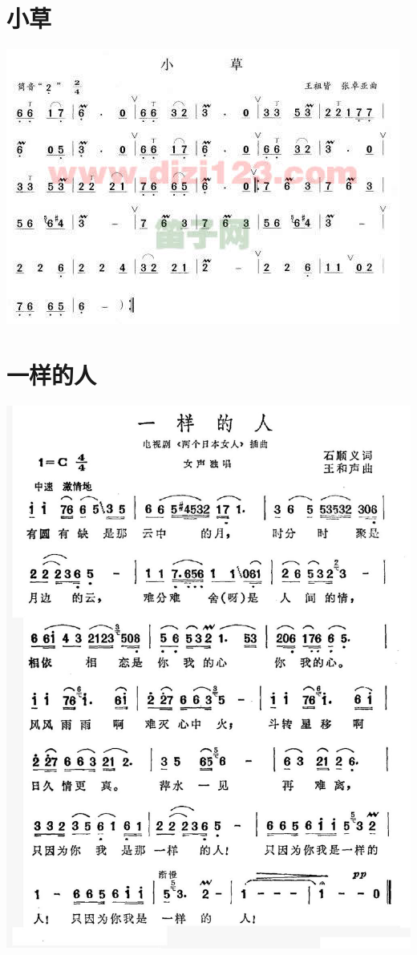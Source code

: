 \documentclass[cn,pad,chinese,chinesefont=nofont]{elegantbook}
\begin{document}
\section{小草}
	\includegraphics[width=\textwidth]{dongxiao/小草.jpg}
\section{一样的人}
	\includegraphics[height=\textheight]{dongxiao/日本-一样的人.jpg}
\end{document}
